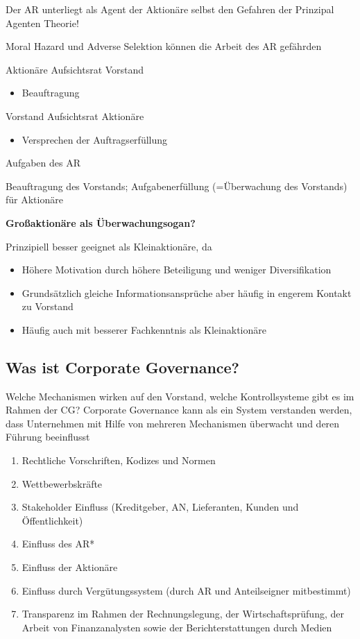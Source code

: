 \documentclass[
]{article}
\providecommand{\tightlist}{%
  \setlength{\itemsep}{0pt}\setlength{\parskip}{0pt}}
\begin{document}
Der AR unterliegt als Agent der Aktionäre selbst den Gefahren der
Prinzipal Agenten Theorie!

Moral Hazard und Adverse Selektion können die Arbeit des AR gefährden

Aktionäre Aufsichtsrat Vorstand

\begin{itemize}
\tightlist
\item
  Beauftragung
\end{itemize}

Vorstand Aufsichtsrat Aktionäre

\begin{itemize}
\tightlist
\item
  Versprechen der Auftragserfüllung
\end{itemize}

Aufgaben des AR

Beauftragung des Vorstands; Aufgabenerfüllung (=Überwachung des
Vorstands) für Aktionäre

\textbf{Großaktionäre als Überwachungsogan?}

Prinzipiell besser geeignet als Kleinaktionäre, da

\begin{itemize}
\tightlist
\item
  Höhere Motivation durch höhere Beteiligung und weniger Diversifikation
\item
  Grundsätzlich gleiche Informationsansprüche aber häufig in engerem
  Kontakt zu Vorstand
\item
  Häufig auch mit besserer Fachkenntnis als Kleinaktionäre
\end{itemize}

\hypertarget{was-ist-corporate-governance}{%
\subsection{Was ist Corporate
Governance?}\label{was-ist-corporate-governance}}

Welche Mechanismen wirken auf den Vorstand, welche Kontrollsysteme gibt
es im Rahmen der CG? Corporate Governance kann als ein System verstanden
werden, dass Unternehmen mit Hilfe von mehreren Mechanismen überwacht
und deren Führung beeinflusst

\begin{enumerate}
\def\labelenumi{\arabic{enumi}.}
\tightlist
\item
  Rechtliche Vorschriften, Kodizes und Normen
\item
  Wettbewerbskräfte
\item
  Stakeholder Einfluss (Kreditgeber, AN, Lieferanten, Kunden und
  Öffentlichkeit)
\item
  Einfluss des AR*
\item
  Einfluss der Aktionäre
\item
  Einfluss durch Vergütungssystem (durch AR und Anteilseigner
  mitbestimmt)
\item
  Transparenz im Rahmen der Rechnungslegung, der Wirtschaftsprüfung, der
  Arbeit von Finanzanalysten sowie der Berichterstattungen durch Medien
\end{enumerate}
\end{document}
